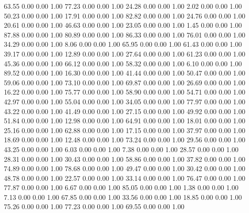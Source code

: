    63.55   0.00   0.00   1.00
   77.23   0.00   0.00   1.00
   24.28   0.00   0.00   1.00
    2.02   0.00   0.00   1.00
   50.23   0.00   0.00   1.00
   17.91   0.00   0.00   1.00
   82.82   0.00   0.00   1.00
   24.76   0.00   0.00   1.00
   20.61   0.00   0.00   1.00
   46.63   0.00   0.00   1.00
   23.05   0.00   0.00   1.00
    1.45   0.00   0.00   1.00
   87.88   0.00   0.00   1.00
   80.89   0.00   0.00   1.00
   86.33   0.00   0.00   1.00
   76.01   0.00   0.00   1.00
   34.29   0.00   0.00   1.00
    8.06   0.00   0.00   1.00
   65.95   0.00   0.00   1.00
   61.43   0.00   0.00   1.00
   39.17   0.00   0.00   1.00
   12.89   0.00   0.00   1.00
   27.64   0.00   0.00   1.00
   61.23   0.00   0.00   1.00
   45.36   0.00   0.00   1.00
   66.12   0.00   0.00   1.00
   58.32   0.00   0.00   1.00
    6.10   0.00   0.00   1.00
   89.52   0.00   0.00   1.00
   16.30   0.00   0.00   1.00
   41.44   0.00   0.00   1.00
   50.47   0.00   0.00   1.00
   59.06   0.00   0.00   1.00
   73.10   0.00   0.00   1.00
   69.87   0.00   0.00   1.00
   26.69   0.00   0.00   1.00
   16.22   0.00   0.00   1.00
   75.77   0.00   0.00   1.00
   58.90   0.00   0.00   1.00
   54.71   0.00   0.00   1.00
   42.97   0.00   0.00   1.00
   55.04   0.00   0.00   1.00
   34.05   0.00   0.00   1.00
   77.97   0.00   0.00   1.00
   43.22   0.00   0.00   1.00
   41.49   0.00   0.00   1.00
   27.15   0.00   0.00   1.00
   49.92   0.00   0.00   1.00
   51.84   0.00   0.00   1.00
   12.98   0.00   0.00   1.00
   64.91   0.00   0.00   1.00
   18.01   0.00   0.00   1.00
   25.16   0.00   0.00   1.00
   62.88   0.00   0.00   1.00
   17.15   0.00   0.00   1.00
   37.97   0.00   0.00   1.00
   18.69   0.00   0.00   1.00
   12.48   0.00   0.00   1.00
   73.24   0.00   0.00   1.00
   29.56   0.00   0.00   1.00
   43.25   0.00   0.00   1.00
    6.03   0.00   0.00   1.00
    7.38   0.00   0.00   1.00
   28.57   0.00   0.00   1.00
   28.31   0.00   0.00   1.00
   30.43   0.00   0.00   1.00
   58.86   0.00   0.00   1.00
   37.82   0.00   0.00   1.00
   74.89   0.00   0.00   1.00
   78.68   0.00   0.00   1.00
   49.47   0.00   0.00   1.00
   30.42   0.00   0.00   1.00
   48.78   0.00   0.00   1.00
   22.57   0.00   0.00   1.00
   33.14   0.00   0.00   1.00
   76.47   0.00   0.00   1.00
   77.87   0.00   0.00   1.00
    6.67   0.00   0.00   1.00
   85.05   0.00   0.00   1.00
    1.38   0.00   0.00   1.00
    7.13   0.00   0.00   1.00
   67.85   0.00   0.00   1.00
   33.56   0.00   0.00   1.00
   18.85   0.00   0.00   1.00
   75.26   0.00   0.00   1.00
   77.23   0.00   0.00   1.00
   69.55   0.00   0.00   1.00
